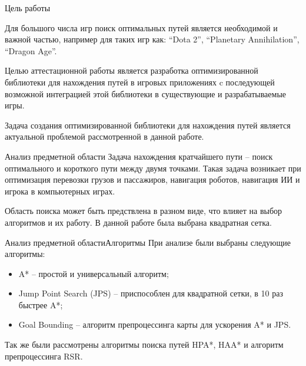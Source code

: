 \documentclass{beamer}
\begin{document}
\begin{frame}
  
  \vfill
  
\end{frame}

\justify

\begin{frame}{Цель работы}

    Для большого числа игр поиск оптимальных путей является необходимой и важной частью, например для таких игр как: ``Dota 2'', ``Planetary Annihilation'', ``Dragon Age''.
    
    \vspace{\baselineskip}
    
    Целью аттестационной работы является разработка оптимизированной библиотеки для нахождения путей в игровых приложениях c последующей возможной интеграцией этой библиотеки в существующие и разрабатываемые игры.
    
    \vspace{\baselineskip}
    
    Задача создания оптимизированной библиотеки для нахождения путей является актуальной проблемой рассмотренной в данной работе.
\end{frame}

\begin{frame}{Анализ предметной области}
    Задача нахождения кратчайшего пути -- поиск оптимального и короткого пути между двумя точками. Такая задача возникает при оптимизация перевозки грузов и пассажиров, навигация роботов, навигация ИИ и игрока в компьютерных играх.
    
        \vspace{\baselineskip}
        
    Область поиска может быть предствлена в разном виде, что влияет на выбор алгоритмов и их работу. В данной работе была выбрана квадратная сетка.
\end{frame}


\begin{frame}{Анализ предметной области}{Алгоритмы}
    При анализе были выбраны следующие алгоритмы:
    
    \begin{itemize}
        \item A* -- простой и универсальный алгоритм;
        \item Jump Point Search (JPS) -- приспособлен для квадратной сетки, в 10 раз быстрее A*;
        \item Goal Bounding -- алгоритм препроцессинга карты для ускорения A* и JPS.
    \end{itemize}
    
    Так же были рассмотрены алгоритмы поиска путей HPA*, HAA* и алгоритм препроцессинга RSR.
\end{frame}
\end{document}
